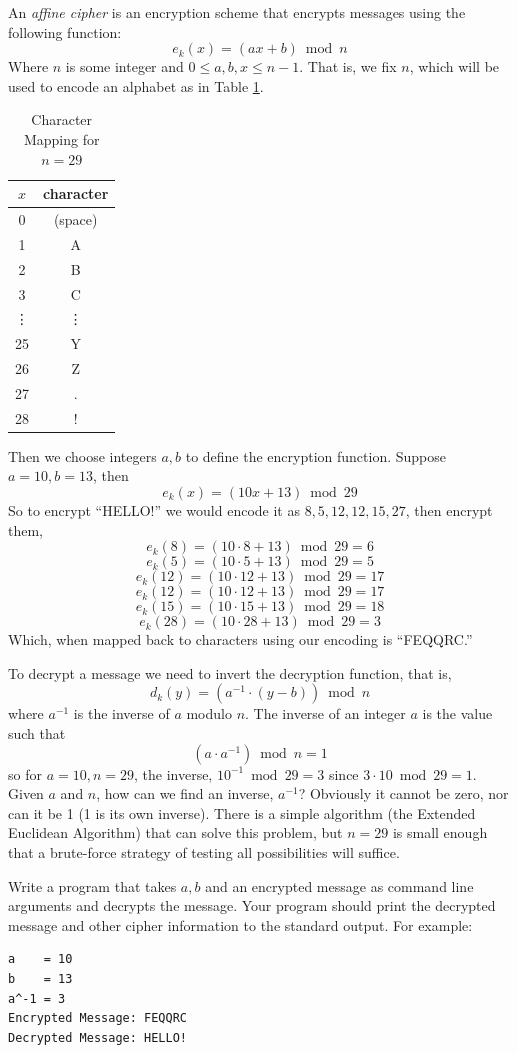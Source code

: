 \begin{exer}
An \emph{affine cipher} is an encryption scheme that encrypts
messages using the following function:
  $$e_k(x) = (a x + b) \bmod{n}$$
Where $n$ is some integer and $0\leq a, b, x \leq n-1$.  That is, we fix
$n$, which will be used to encode an alphabet as in Table \ref{table:characterMapping}.

\begin{table}[h]
\centering
\begin{tabular}{c|c}
$x$ & character \\
\hline\hline
0 & (space) \\
1 & A \\
2 & B \\
3 & C \\
\vdots & \vdots \\
25 & Y \\
26 & Z \\
27 & .\\
28 & !\\
\end{tabular}
\caption{Character Mapping for $n = 29$}
\label{table:characterMapping}
\end{table}

Then we choose integers $a, b$ to define the encryption function.  Suppose
$a = 10, b = 13$, then 
  $$e_k(x) = (10x + 13) \bmod{29}$$
So to encrypt ``HELLO!'' we would encode it as $8, 5, 12, 12, 15, 27$, then encrypt
them, 
  $$e_k(8) = (10 \cdot 8 + 13) \bmod{29} = 6$$
  $$e_k(5) = (10 \cdot 5 + 13) \bmod{29} = 5$$
  $$e_k(12) = (10 \cdot 12 + 13) \bmod{29} = 17$$
  $$e_k(12) = (10 \cdot 12 + 13) \bmod{29} = 17$$
  $$e_k(15) = (10 \cdot 15 + 13) \bmod{29} = 18$$
  $$e_k(28) = (10 \cdot 28 + 13) \bmod{29} = 3$$
Which, when mapped back to characters using our encoding is ``FEQQRC.''

To decrypt a message we need to invert the decryption function, that is, 
  $$d_k(y) = \left( a^{-1} \cdot (y-b) \right) \bmod{n}$$
where $a^{-1}$ is the inverse of $a$ modulo $n$.  The inverse of an integer
$a$ is the value such that 
  $$(a \cdot a^{-1}) \bmod{n} = 1$$
so for $a = 10, n = 29$, the inverse, $10^{-1} \bmod{29} = 3$ since $3 \cdot 10 \bmod{29} = 1$.
Given $a$ and $n$, how can we find an inverse, $a^{-1}$?  Obviously it cannot be
zero, nor can it be 1 (1 is its own inverse).  There is a simple algorithm (the Extended Euclidean
Algorithm) that can solve this problem, but $n = 29$ is small enough that a brute-force
strategy of testing all possibilities will suffice.

Write a program that takes $a, b$ and an encrypted message as command 
line arguments and decrypts the message.  Your program should print the
decrypted message and other cipher information to the standard output.  For
example:

\begin{verbatim}
a    = 10
b    = 13
a^-1 = 3
Encrypted Message: FEQQRC
Decrypted Message: HELLO!
\end{verbatim}
\end{exer}


